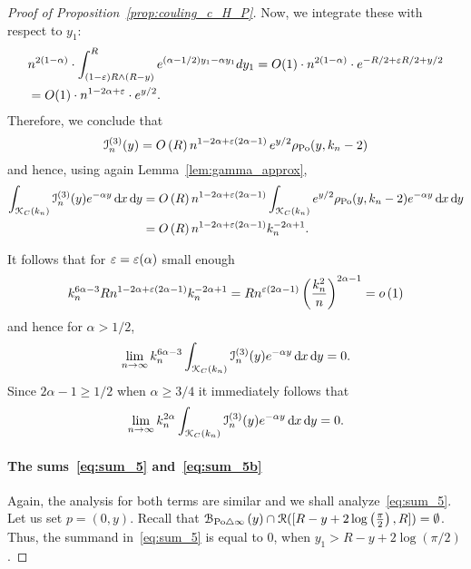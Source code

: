 \begin{proof}[Proof of Proposition~\ref{prop:couling_c_H_P}]
Now, we integrate these with respect to $y_1$:
\begin{align*}
	&n^{2(1-\alpha)} \cdot \int_{(1-\varepsilon) R \wedge (R-y)}^{R} e^{(\alpha -1/2)y_1 - \alpha y_1} dy_1 
		=O(1) \cdot n^{2(1-\alpha)} \cdot e^{-R/2 + \varepsilon R/2  + y/2}  \\
	&= O(1) \cdot n^{1-2\alpha + \varepsilon} \cdot e^{y/2}.
\end{align*}
Therefore, we conclude that
\[
	\mathcal{I}_n^{(3)}(y) = O\left(R\right) n^{1-2\alpha +\varepsilon(2\alpha -1)} \, e^{y/2} \rho_{{\mathrm{Po}}}(y,k_n-2)
\]
and hence, using again Lemma~\ref{lem:gamma_approx},
\begin{align*}
	\int_{{\mathcal K}_{C}(k_n)} \mathcal{I}_n^{(3)}(y) e^{-\alpha y} \operatorname{\mathrm{d}\hspace{-2pt}} x \operatorname{\mathrm{d}\hspace{-2pt}} y
	&= O\left(R\right) n^{1-2\alpha +\varepsilon(2\alpha -1)} \int_{{\mathcal K}_{C}(k_n)} e^{y/2} 
		\rho_{{\mathrm{Po}}}(y,k_n-2) e^{-\alpha y} \operatorname{\mathrm{d}\hspace{-2pt}} x \operatorname{\mathrm{d}\hspace{-2pt}} y\\
	&= O\left(R\right) n^{1-2\alpha +\varepsilon(2\alpha -1)} k_n^{-2\alpha + 1}.
\end{align*}

It follows that for $\varepsilon = \varepsilon(\alpha)$ small enough
\[
	k_n^{6\alpha - 3} R n^{1-2\alpha +\varepsilon(2\alpha -1)} k_n^{-2\alpha + 1}
	= R n^{\varepsilon(2\alpha -1)} \left(\frac{k_n^2}{n}\right)^{2\alpha - 1} = o\left(1\right)
\]
and hence for $\alpha > 1/2$,
\[
	\lim_{n \to \infty} k_n^{6\alpha - 3} \int_{{\mathcal K}_{C}(k_n)} \mathcal{I}_n^{(3)}(y) e^{-\alpha y} \operatorname{\mathrm{d}\hspace{-2pt}} x \operatorname{\mathrm{d}\hspace{-2pt}} y = 0.
\]
Since $2\alpha - 1 \ge 1/2$ when $\alpha \ge 3/4$ it immediately follows that
\[
	\lim_{n \to \infty} k_n^{2\alpha} \int_{{\mathcal K}_{C}(k_n)} \mathcal{I}_n^{(3)}(y) e^{-\alpha y} \operatorname{\mathrm{d}\hspace{-2pt}} x \operatorname{\mathrm{d}\hspace{-2pt}} y = 0.
\]

\paragraph{The sums~\eqref{eq:sum_5} and~\eqref{eq:sum_5b}}

Again, the analysis for both terms are similar and we shall analyze~\eqref{eq:sum_5}. Let us set $p=(0,y)$. Recall that ${\mathcal B}_{{\mathrm{Po}} \bigtriangleup \infty}\left(y\right)\cap {\mathcal R}([R - y + 2 \log\left(\frac{\pi}{2}\right),R]) = \emptyset$. Thus, the summand in~\eqref{eq:sum_5} is equal to 0, when $y_1 > R - y + 2 \log (\pi/2)$. 


\end{proof}
